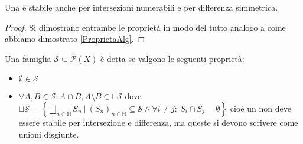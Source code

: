 \begin{remark}\label{ProprietaSigAlg}
	Una \sigalg{} è stabile anche per intersezioni numerabili e per differenza simmetrica.
\end{remark}
\begin{proof}
	Si dimostrano entrambe le proprietà in modo del tutto analogo a come abbiamo dimostrato \cref{ProprietaAlg}.
\end{proof}

\begin{definition}[\Semiring{}]
	Una famiglia $\mathcal S\subseteq \mathcal P(X)$ è detta \semiring{} se valgono le seguenti proprietà:
	\begin{itemize}
		\item $\emptyset\in \mathcal S$
		\item $\displaystyle\forall A,B\in \mathcal S: A\cap B, A\setminus B\in \sqcup \mathcal S$ dove
		$\displaystyle
		\sqcup{ \mathcal S }=\left\{\bigsqcup_{n\in \mathbb N} S_n\ |\ (S_n)_{n\in\mathbb N} \subseteq \mathcal S \wedge \forall i\not= j:\ S_i\cap S_j=\emptyset\right\}$ 
		cioè un \semiring{} non deve essere stabile per intersezione e differenza, ma queste si devono scrivere come unioni disgiunte.
	\end{itemize}
\end{definition}


